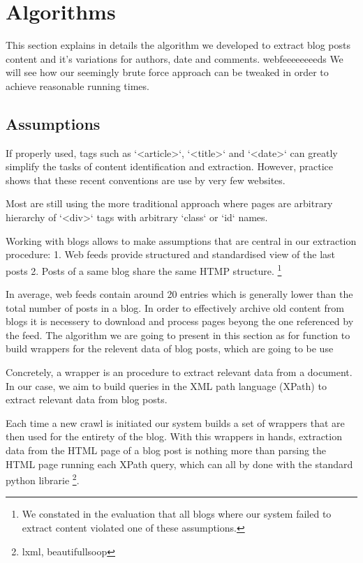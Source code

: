 \section{Algorithms}

This section explains in details the algorithm we developed to extract blog posts content and it's variations for authors, date and comments.
webfeeeeeeeeds
We will see how our seemingly brute force approach can be tweaked in order to achieve reasonable running times.

\subsection{Assumptions}

\cite{worldwidewebconsortiumw3c2002}
If properly used, tags such as `<article>`, `<title>` and `<date>` can greatly simplify the tasks of content identification and extraction. However, practice shows that these recent conventions are use by very few websites.

Most are still using the more traditional approach where pages are arbitrary hierarchy of `<div>` tags with arbitrary `class` or `id` names.


Working with blogs allows to make assumptions that are central in our extraction procedure:
1. Web feeds provide structured and standardised view of the last posts
2. Posts of a same blog share the same HTMP structure.
\footnote{We constated in the evaluation that all blogs where our system failed to extract content violated one of these assumptions.}

In average, web feeds contain around 20 entries \cite{french paper} which is generally lower than the total number of posts in a blog. In order to effectively archive old content from blogs it is necessery to download and process pages beyong the one referenced by the feed. The algorithm we are going to present in this section as for function to build wrappers for the relevent data of blog posts, which are going to be use


Concretely, a wrapper is an procedure to extract relevant data from a document. In our case, we aim to build queries in the XML path language (XPath) to extract relevant data from blog posts.

Each time a new crawl is initiated our system builds a set of wrappers that are then used for the entirety of the blog. With this wrappers in hands, extraction data from the HTML page of a blog post is nothing more than parsing the HTML page running each XPath query, which can all by done with the standard python librarie \footnote{lxml, beautifullsoop}.

